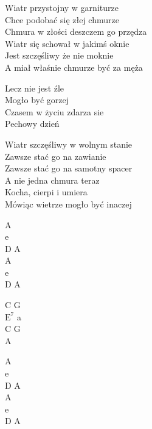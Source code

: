\begin{text}
    Wiatr przystojny w garniturze\\
    Chce podobać się złej chmurze\\
    Chmura  w złości deszczem go przędza\\
    Wiatr się schował w jakimś oknie\\
    Jest szczęśliwy że nie moknie\\
    A miał właśnie chmurze być za męża

    \vin Lecz nie jest źle\\
    \vin Mogło być gorzej\\
    \vin Czasem w życiu zdarza sie\\
    \vin Pechowy dzień

    Wiatr szczęśliwy w wolnym stanie\\
    Zawsze stać go na zawianie\\
    Zawsze stać go na samotny spacer\\
    A nie jedna chmura teraz\\
    Kocha, cierpi i umiera\\
    Mówiąc wietrze mogło być inaczej
\end{text}
\begin{chord}
    A\\
    e\\
    D A\\
    A\\
    e\\
    D A

    C G\\
    $\mathrm{E^7}$ a\\
    C G\\
    A

    A\\
    e\\
    D A\\
    A\\
    e\\
    D A
\end{chord}
